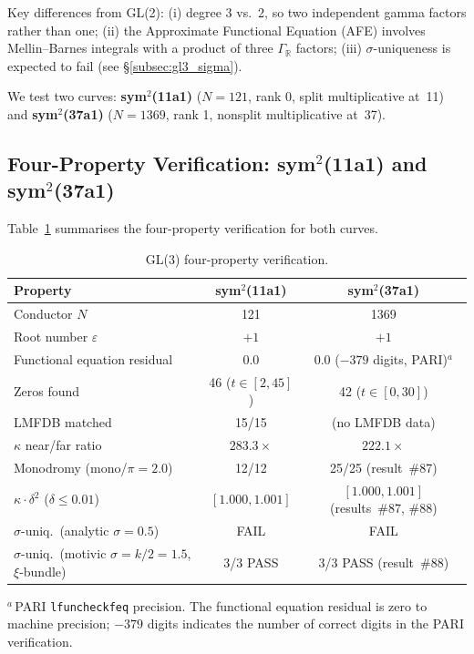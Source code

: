 \documentclass[11pt, a4paper]{article}
\theoremstyle{definition}
\theoremstyle{plain}
\begin{document}
Key differences from GL(2): (i) degree 3 vs.\ 2, so two independent gamma
factors rather than one; (ii) the Approximate Functional Equation (AFE)
involves Mellin--Barnes integrals with a product of three $\Gamma_{\mathbb{R}}$
factors; (iii) $\sigma$-uniqueness is expected to fail (see
\S\ref{subsec:gl3_sigma}).

We test two curves: \textbf{sym$^2$(11a1)} ($N = 121$, rank 0, split
multiplicative at~11) and \textbf{sym$^2$(37a1)} ($N = 1369$, rank 1,
nonsplit multiplicative at~37).

\subsection{Four-Property Verification: sym$^2$(11a1) and sym$^2$(37a1)}
\label{subsec:gl3_fourprop}

Table~\ref{tab:gl3_fourprop} summarises the four-property verification for
both curves.

\begin{table}[ht]
\centering
\caption{GL(3) four-property verification.\label{tab:gl3_fourprop}}
\smallskip
\begin{tabular}{lcc}
\toprule
Property & sym$^2$(11a1) & sym$^2$(37a1) \\
\midrule
Conductor $N$ & 121 & 1369 \\
Root number $\varepsilon$ & $+1$ & $+1$ \\
Functional equation residual & $0.0$ & $0.0$ ($-379$ digits, PARI)${}^a$ \\
Zeros found & 46 ($t{\in}[2,45]$) & 42 ($t{\in}[0,30]$) \\
LMFDB matched & 15/15 & (no LMFDB data) \\
$\kappa$ near/far ratio & $283.3\times$ & $222.1\times$ \\
Monodromy (mono/$\pi = 2.0$) & 12/12 & 25/25 (result~\#87) \\
$\kappa{\cdot}\delta^2$ ($\delta \leq 0.01$) & $[1.000, 1.001]$ & $[1.000, 1.001]$ (results~\#87, \#88) \\
$\sigma$-uniq.\ (analytic $\sigma{=}0.5$) & FAIL & FAIL \\
$\sigma$-uniq.\ (motivic $\sigma{=}k/2{=}1.5$, $\xi$-bundle) & 3/3 PASS & 3/3 PASS (result~\#88) \\
\bottomrule
\end{tabular}

\medskip\noindent
{\footnotesize ${}^a$\,PARI \texttt{lfuncheckfeq} precision.
 The functional equation residual is zero to machine precision; $-379$ digits indicates the
 number of correct digits in the PARI verification.}
\end{table}
\end{document}
